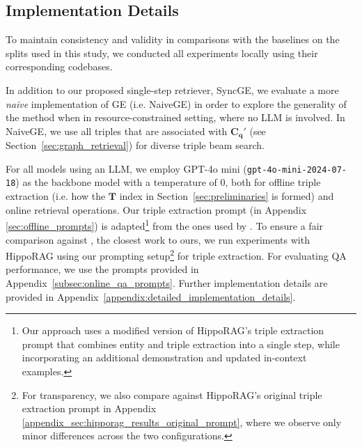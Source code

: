 \subsection{Implementation Details}
To maintain consistency and validity in comparisons with the baselines on the splits used in this study, we conducted all experiments locally using their corresponding codebases.

In addition to our proposed single-step retriever, SyncGE, we evaluate a more \textit{naive} implementation of GE (i.e. NaiveGE) in order to explore the generality of the method when in resource-constrained setting, where no LLM is involved. In NaiveGE, we use all triples that are associated with $\mathbf{C}_\mathbf{q}'$ (see Section~\ref{sec:graph_retrieval}) for diverse triple beam search.


For all models using an LLM, we employ GPT-4o mini (\texttt{gpt-4o-mini-2024-07-18}) as the backbone model with a temperature of 0, both for offline triple extraction (i.e. how the $\mathbf{T}$ index in Section~\ref{sec:preliminaries} is formed) and online retrieval operations. Our triple extraction prompt (in Appendix \ref{sec:offline_prompts}) is adapted\footnote{Our approach uses a modified version of HippoRAG's triple extraction prompt that combines entity and triple extraction into a single step, while incorporating an additional demonstration and updated in-context examples.} from the ones used by \citeauthor{Gutierrez2024}. To ensure a fair comparison against \citeauthor{Gutierrez2024}, the closest work to ours, we run experiments with HippoRAG using our prompting setup\footnote{For transparency, we also compare against HippoRAG's original triple extraction prompt in Appendix \ref{appendix_sec:hipporag_results_original_prompt}, where we observe only minor differences across the two configurations.} for triple extraction. For evaluating QA performance, we use the prompts provided in Appendix~\ref{subsec:online_qa_prompts}. Further implementation details are provided in Appendix~\ref{appendix:detailed_implementation_details}.
